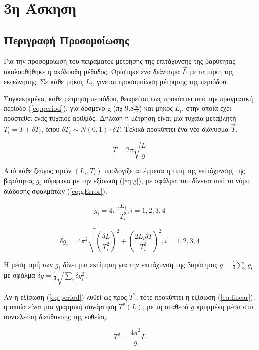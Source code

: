\documentclass[assignment1.tex]{subfiles}
\begin{document}
\section*{3η Άσκηση}


\subsection{Περιγραφή Προσομοίωσης}
Για την προσομοίωση του πειράματος μέτρησης της επιτάχυνσης της βαρύτητας ακολουθήθηκε η ακόλουθη μέθοδος. Ορίστηκε ένα διάνυσμα $\vec{L}$ με τα μήκη της εκφώνησης. Σε κάθε μήκος $L_i$, γίνεται προσομοίωση μέτρησης της περιόδου. 

Συγκεκριμένα, κάθε μέτρηση περιόδου, θεωρείται πως προκύπτει από την πραγματική περίοδο (\ref{eq:period}), για δοσμένο \textlatin{g} (πχ $9.8\frac{m}{s^2}$) και μήκος $L_i$, στην οποία έχει προστεθεί ένας τυχαίος αριθμός. Δηλαδή η μέτρηση είναι μια τυχαία μεταβλητή $T_i = T + \delta T_i$, όπου $\delta T_i \sim N(0,1)\cdot \delta T$. Τελικά προκύπτει ένα νέο διάνυσμα $\vec{T}$.

\begin{equation}
T = 2\pi \sqrt{\frac{L}{g}}
\label{eq:period}
\end{equation}

Από κάθε ζεύγος τιμών $(L_i, T_i)$ υπολογίζεται έμμεσα η τιμή της επιτάχυνσης της βαρύτητας $g_i$ σύμφωνα με την εξίσωση (\ref{eq:g}), με σφάλμα που δίνεται από το νόμο διάδοσης σφαλμάτων (\ref{eq:gError}).

\begin{equation}
g_i = 4\pi^2 \frac{L_i}{T_i^2}, i=1,2,3,4
\label{eq:g}
\end{equation}

\begin{equation}
\delta g_i = 4\pi^2 \sqrt{\left(\frac{\delta L}{T_i^2}\right)^2 + \left(\frac{2L_i\delta T}{T_i^3}\right)^2}, i=1,2,3,4
\label{eq:gError}
\end{equation}

Η μέση τιμή των $g_i$ δίνει μια εκτίμηση για την επιτάχυνση της βαρύτητας $g=\frac{1}{4}\sum_i g_i$, με σφάλμα $\delta g = \frac{1}{4}\sqrt{\sum_i \delta g_i^2}$.

Αν η εξίσωση (\ref{eq:period}) λυθεί ως προς $T^2$, τότε προκύπτει η εξίσωση (\ref{eq:linear}), η οποία είναι μια γραμμική συνάρτηση $T^2(L)$, με τη σταθερά $g$ κρυμμένη μέσα στο συντελεστή διεύθυνσης της ευθείας. 

\begin{equation}
T^2 = \frac{4\pi^2}{g}L
\label{eq:linear}
\end{equation}
\end{document}
